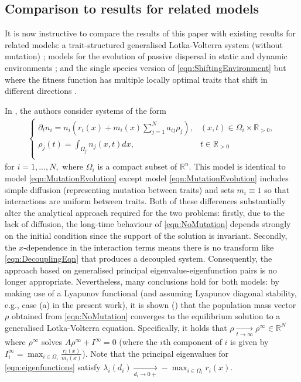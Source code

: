 \documentclass{article}
\begin{document}
\subsection{Comparison to results for related models}
It is now instructive to compare the results of this paper with existing results for related models: a trait-structured generalised Lotka-Volterra system (without mutation) \cite{pouchol2018global}; models for the evolution of passive dispersal in static and dynamic environments \cite{dockery1998evolution}; and the single species version of \eqref{eqn:ShiftingEnvironment} but where the fitness function has multiple locally optimal traits that shift in different directions \cite{adaptivedynamicsdivergingfitness}.

In \cite{pouchol2018global}, the authors consider systems of the form
\begin{align}\label{eqn:NoMutation}
  \begin{cases}
      \partial_tn_i=n_i\left(r_i(x)+m_i(x)\sum_{j=1}^Na_{ij}\rho_j\right),&(x,t)\in\Omega_i\times{}\mathbb{R}_{>0},\\
    \rho_j(t)=\int_{\Omega_j}n_j(x,t)dx,&t\in\mathbb{R}_{>0}\\
  \end{cases}  
\end{align}
for $i=1,...,N,$ where $\Omega_i$ is a compact subset of $\mathbb{R}^n$. This model is identical to model \eqref{eqn:MutationEvolution} except model \eqref{eqn:MutationEvolution} includes simple diffusion (representing mutation between traits) and sets $m_i\equiv{1}$ so that interactions are uniform between traits. Both of these differences substantially alter the analytical approach required for the two problems: firstly, due to the lack of diffusion, the long-time behaviour of \eqref{eqn:NoMutation} depends strongly on the initial condition since the support of the solution is invariant. Secondly, the $x$-dependence in the interaction terms means there is no transform like \eqref{eqn:DecouplingEqn} that produces a decoupled system. Consequently, the approach based on generalised principal eigenvalue-eigenfunction pairs is no longer appropriate. Nevertheless, many conclusions hold for both models:
by making use of a Lyapunov functional (and assuming Lyapunov diagonal stability, e.g., case (a) in the present work), it is shown (\cite[Theorem 2.1]{pouchol2018global}) that the population  mass vector $\rho$ obtained from \eqref{eqn:NoMutation} converges to the equilibrium solution to a generalised Lotka-Volterra equation. Specifically, it holds that $\rho\xrightarrow[t\rightarrow\infty]{}\rho^\infty\in\mathbb{R}^N$ where $\rho^\infty$ solves $A\rho{}^\infty+I^\infty=0$ (where the $i$th component of $i$ is given by $I^\infty_i=\max_{i\in\Omega_i}\frac{r_i(x)}{m_i(x)}$).  Note that the principal eigenvalues for \eqref{eqn:eigenfunctions} satisfy $\lambda_i(d_i)\xrightarrow[d_i\rightarrow{0+}]{}-\max_{i\in\Omega_i}r_i(x)$.
\end{document}
